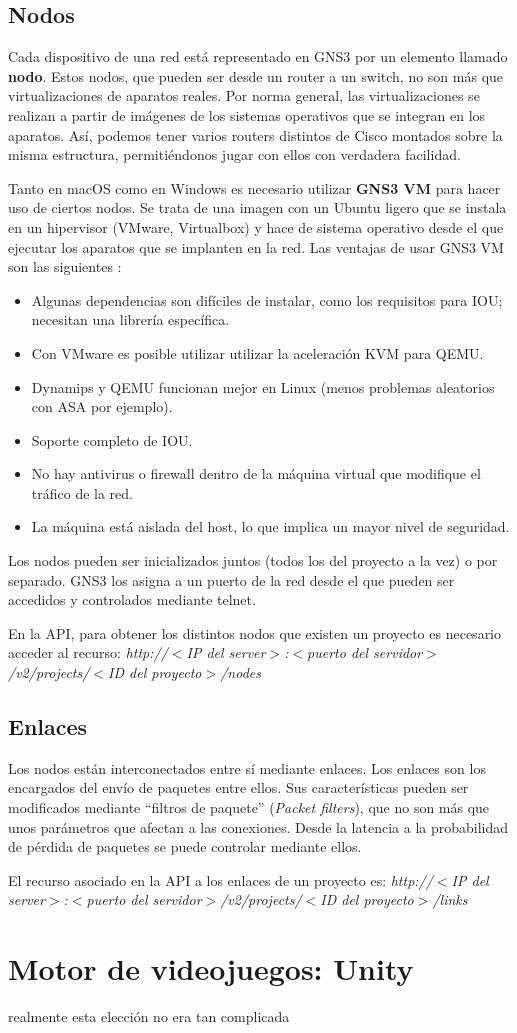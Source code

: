 \subsection{Nodos}
Cada dispositivo de una red está representado en GNS3 por un elemento llamado \textbf{nodo}. Estos nodos, que pueden ser desde un router a un switch, no son más que virtualizaciones de aparatos reales. Por norma general, las virtualizaciones se realizan a partir de imágenes de los sistemas operativos que se integran en los aparatos. Así, podemos tener varios routers distintos de Cisco montados sobre la misma estructura, permitiéndonos jugar con ellos con verdadera facilidad.

Tanto en macOS como en Windows es necesario utilizar \textbf{GNS3 VM} para hacer uso de ciertos nodos. Se trata de una imagen con un Ubuntu ligero que se instala en un hipervisor (VMware, Virtualbox) y hace de sistema operativo desde el que ejecutar los aparatos que se implanten en la red. Las ventajas de usar GNS3 VM son las siguientes \cite{gns3vm}:
\begin{itemize}
\item Algunas dependencias son difíciles de instalar, como los requisitos para IOU; necesitan una librería específica.
\item Con VMware es posible utilizar utilizar la aceleración KVM para QEMU.
\item Dynamips y QEMU funcionan mejor en Linux (menos problemas aleatorios con ASA por ejemplo).
\item Soporte completo de IOU.
\item No hay antivirus o firewall dentro de la máquina virtual que modifique el tráfico de la red.
\item La máquina está aislada del host, lo que implica un mayor nivel de seguridad.
\end{itemize}

Los nodos pueden ser inicializados juntos (todos los del proyecto a la vez) o por separado. GNS3 los asigna a un puerto de la red desde el que pueden ser accedidos y controlados mediante telnet.

En la API, para obtener los distintos nodos que existen un proyecto es necesario acceder al recurso: \textit{http://$<$IP del server$>$:$<$puerto del servidor$>$/v2/projects/$<$ID del proyecto$>$/nodes}

\subsection{Enlaces}
Los nodos están interconectados entre sí mediante enlaces. Los enlaces son los encargados del envío de paquetes entre ellos. Sus características pueden ser modificados mediante ``filtros de paquete'' (\textit{Packet filters}), que no son más que unos parámetros que afectan a las conexiones. Desde la latencia a la probabilidad de pérdida de paquetes se puede controlar mediante ellos.

El recurso asociado en la API a los enlaces de un proyecto es: \textit{http://$<$IP del server$>$:$<$puerto del servidor$>$/v2/projects/$<$ID del proyecto$>$/links}
 
\section{Motor de videojuegos: Unity}
realmente esta elección no era tan complicada